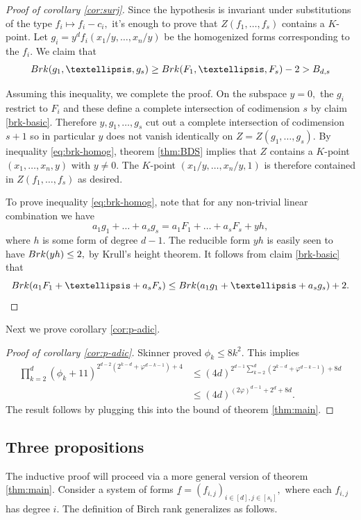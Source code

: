 \documentclass[10pt,a4paper]{amsart}
\let\ul\underline
\theoremstyle{definition}
\newcommand{\brk}{\textnormal{Brk}}
\begin{document}
\begin{proof}[Proof of corollary \ref{cor:surj}]
Since the hypothesis is invariant under substitutions of the type $f_i\mapsto f_i-c_i,$ it's enough to prove that $Z(f_1,\ldots,f_s)$ contains a $K$-point. Let $g_i = y^d f_i(x_1/y,\ldots,x_n/y)$ be the homogenized forms corresponding to the $f_i.$ We claim that 
\begin{equation}\label{eq:brk-homog}
    \brk(g_1,\ldots,g_s) \ge \brk(F_1,\ldots,F_s) -2 > B_{d,s}
\end{equation}

Assuming this inequality, we complete the proof. On the subspace $y=0,$ the $g_i$ restrict to $F_i$ and these define a complete intersection of codimension $s$ by claim \ref{brk-basic}. Therefore $y,g_1,\ldots,g_s$ cut out a complete intersection of codimension $s+1$ so in particular $y$ does not vanish identically on $Z = Z(g_1,\ldots,g_s).$ By inequality \eqref{eq:brk-homog}, theorem \ref{thm:BDS} implies that $Z$ contains a $K$-point $(x_1,\ldots,x_n,y)$ with $y\neq 0.$ The $K$-point $(x_1/y,\ldots,x_n/y,1)$ is therefore contained in $Z(f_1,\ldots,f_s)$ as desired.    

To prove inequality \eqref{eq:brk-homog}, note that for any non-trivial linear combination we have 
\[
a_1g_1+\ldots+a_sg_s = a_1F_1+\ldots+a_sF_s + yh,
\]
where $h$ is some form of degree $d-1.$ The reducible form $yh$ is easily seen to have $\brk(yh) \le 2,$ by Krull's height theorem. It follows from claim \ref{brk-basic} that 
\[
\brk(a_1F_1+\ldots+a_sF_s) \le \brk(a_1g_1+\ldots+a_sg_s) +2.
\]
\end{proof}




Next we prove corollary \ref{cor:p-adic}.

\begin{proof}[Proof of corollary \ref{cor:p-adic}]
    Skinner proved \cite{Skinner-phi}  $\phi_k \le 8k^2.$ This implies 
    \begin{align*}
         \prod_{k=2}^d (\phi_k+11)^{2^{d-2}(2^{k-d}+\varphi^{d-k-1})+4} &\le           (4d)^{2^{d-1} \sum_{k=2}^d (2^{k-d}+\varphi^{d-k-1}) +8d} \\
         &\le (4d)^{(2\varphi)^{d-1} + 2^d +8d}. 
    \end{align*}
    The result follows by plugging this into the bound of theorem \ref{thm:main}.
\end{proof}

\subsection{Three propositions}
The inductive proof will proceed via a more general version of theorem \ref{thm:main}. Consider a system of forms $\ul{f} = (f_{i,j})_{i\in [d],j\in [s_i]},$ where each $f_{i,j}$ has degree $i.$ The definition of Birch rank generalizes as follows.
\end{document}
